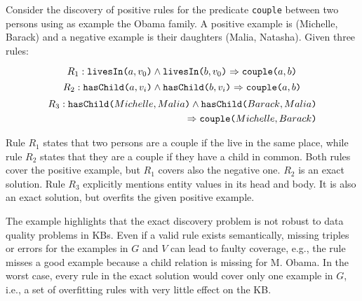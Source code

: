 \begin{example}
	Consider the discovery of positive rules for the predicate {\tt couple} between two persons using as example the Obama family. A positive example is (Michelle, Barack) and a negative example is their daughters (Malia, Natasha). 
	Given three rules:
	
	\vspace{-1ex}	
	{\small	
		\begin{equation*}
		R_{1}:	\texttt{livesIn(}a,v_0\texttt{)} \wedge \texttt{livesIn(}b,v_0\texttt{)} \Rightarrow  \texttt{couple(}a,b\texttt{)}  
		\end{equation*}
			\vspace{-2ex}	
		\begin{equation*}
		R_{2}:	\texttt{hasChild(}a,v_i\texttt{)} \wedge \texttt{hasChild(}b,v_i\texttt{)} \Rightarrow  \texttt{couple(}a,b\texttt{)}  
		\end{equation*}
		\vspace{-1ex}	
		\begin{equation*}
			\begin{split}
			R_{3}:	\texttt{hasChild(}Michelle,Malia\texttt{)} \wedge  \texttt{hasChild(}Barack,Malia\texttt{)} \\ \Rightarrow \texttt{couple(}Michelle,Barack\texttt{)}
			\end{split}
		\end{equation*}
	}
	\vspace{-1ex}	
	
	\noindent
	Rule $R_{1}$ states that two persons are a couple if the live in the same place, while rule $R_{2}$ states that they are a couple if they have a child in common. Both rules cover the positive example, but $R_{1}$ covers also the negative one.
	$R_{2}$ is an exact solution. Rule $R_{3}$ explicitly mentions entity values in its head and body. It is also an exact solution, but overfits the given positive example. %
\end{example} 

The example highlights that the exact discovery problem is not robust to %
data quality problems in KBs. Even if a valid rule exists semantically, missing triples or errors for the examples in $G$ and $V$ can lead to faulty coverage, e.g., the rule misses a good example because a child relation is missing for M. Obama. %
In the worst case, %
every rule in the exact solution would cover only one example in $G$, %
i.e., a set of overfitting rules with very little effect on the KB.

